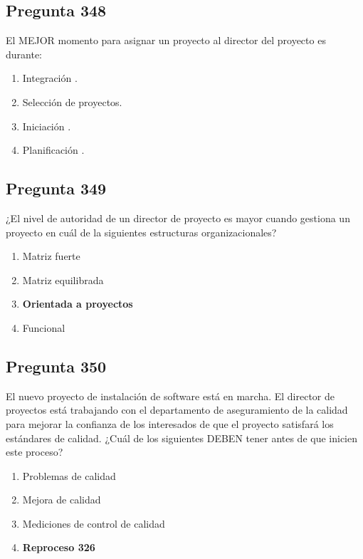 \documentclass[11pt,a4paper]{article}
\begin{document}
\subsection*{Pregunta 348}
El MEJOR momento para asignar un proyecto al director del proyecto es durante:

\begin{enumerate}[label=\alph*)]
  \item Integración .
  \item Selección de proyectos.
  \item Iniciación .
  \item Planificación .
\end{enumerate}

\subsection*{Pregunta 349}
¿El nivel de autoridad de un director de proyecto es mayor cuando gestiona un proyecto en cuál de la siguientes estructuras organizacionales?

\begin{enumerate}[label=\alph*)]
  \item Matriz fuerte
  \item Matriz equilibrada
  \item \textbf{Orientada a proyectos}
  \item Funcional
\end{enumerate}

\subsection*{Pregunta 350}
El nuevo proyecto de instalación de software está en marcha. El director de proyectos está trabajando con el departamento de aseguramiento de la calidad para mejorar la confianza de los interesados de que el proyecto satisfará los estándares de calidad. ¿Cuál de los siguientes DEBEN tener antes de que inicien este proceso?

\begin{enumerate}[label=\alph*)]
  \item Problemas de calidad
  \item Mejora de calidad
  \item Mediciones de control de calidad
  \item \textbf{Reproceso 326}
\end{enumerate}
\end{document}
